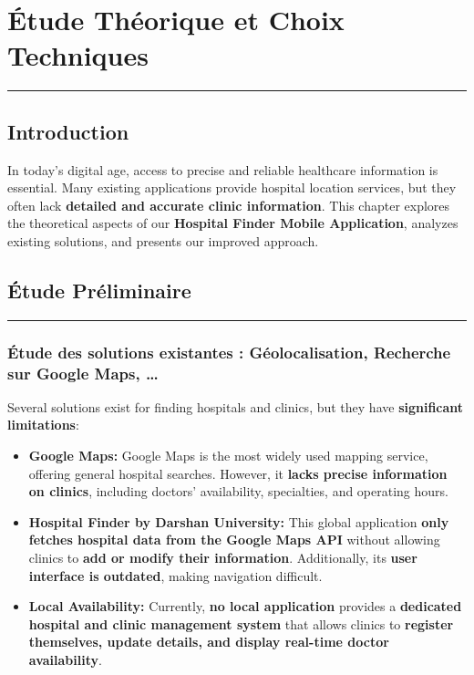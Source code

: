 \documentclass[12pt]{report}
\begin{document}
\newpage

\chapter{\textbf{Étude Théorique et Choix Techniques}}  
\rule{\linewidth}{1.5pt} 


\section{\textbf{Introduction}}  

In today's digital age, access to precise and reliable healthcare information is essential. Many existing applications provide hospital location services, but they often lack \textbf{detailed and accurate clinic information}.  
This chapter explores the theoretical aspects of our \textbf{Hospital Finder Mobile Application}, analyzes existing solutions, and presents our improved approach.  

\section{\textbf{Étude Préliminaire}}  
\vspace{-0.5cm}
\rule{7.5cm}{1.5pt}
\vspace{-0.5cm}
\subsection{\textbf{Étude des solutions existantes : Géolocalisation, Recherche sur Google Maps, …}}  

Several solutions exist for finding hospitals and clinics, but they have \textbf{significant limitations}:  

\begin{itemize}
    \item \textbf{Google Maps:}  
    Google Maps is the most widely used mapping service, offering general hospital searches. However, it \textbf{lacks precise information on clinics}, including doctors' availability, specialties, and operating hours.  
    \item \textbf{Hospital Finder by Darshan University:}  
    This global application \textbf{only fetches hospital data from the Google Maps API} without allowing clinics to \textbf{add or modify their information}. Additionally, its \textbf{user interface is outdated}, making navigation difficult.  
    \item \textbf{Local Availability:}  
    Currently, \textbf{no local application} provides a \textbf{dedicated hospital and clinic management system} that allows clinics to \textbf{register themselves, update details, and display real-time doctor availability}.
\end{itemize}
\end{document}
